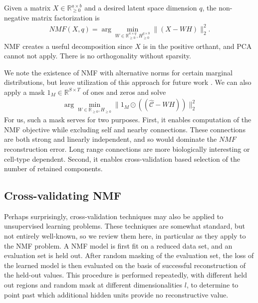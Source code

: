 \documentclass{article}
\begin{document}
Given a matrix $X \in \mathbb R_{\geq 0}^{a \times b}$ and a desired latent space dimension $q$, the non-negative matrix factorization is
\begin{eqnarray*}
NMF(X, q) = \arg \min_{W \in \mathbb R_{\geq 0}^{a \times q} ,H_{\geq 0}^{q \times b }} \| (  X  - WH)\|_2^2.
\end{eqnarray*}
NMF creates a useful decomposition since $X$ is in the positive orthant, and PCA cannot not apply.
There is no orthogonality without sparsity.

We note the existence of NMF with alternative norms for certain marginal distributions, but leave utilization of this approach for future work \citep{Brunet2004-gi}.
We can also apply a mask $1_M \in \mathbb R^{S \times T}$ of ones and zeros and solve
\begin{eqnarray*}
\arg \min_{W \in \mathbb R_{\geq 0} ,H_{\geq 0} } \| 1_M \odot  ((\hat{  \mathcal C}  - WH))\|_2^2
\end{eqnarray*}
For us, such a mask serves for two purposes.
First, it enables computation of the NMF objective while excluding self and nearby connections.
These connections are both strong and linearly independent, and so would dominate the $NMF$ reconstruction error.
Long range connections are more biologically interesting or cell-type dependent.
Second, it enables cross-validation based selection of the number of retained components.

\subsection{Cross-validating NMF}

Perhaps surprisingly, cross-validation techniques may also be applied to unsupervised learning problems.
These techniques are somewhat standard, but not entirely well-known, so we review them here, in particular as they apply to the NMF problem.
A NMF model is first fit on a reduced data set, and an evaluation set is held out.
After random masking of the evaluation set, the loss of the learned model is then evaluated on the basis of successful reconstruction of the held-out values.
This procedure is performed repeatedly, with different held out regions and random mask at different dimensionalities $l$, to determine to point past which additional hidden units provide no reconstructive value.
\end{document}
